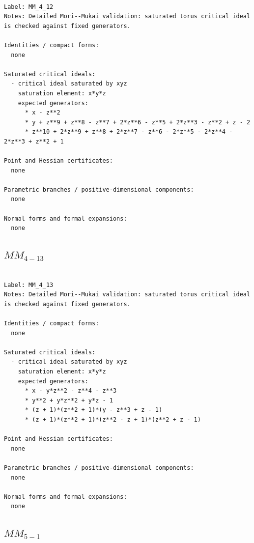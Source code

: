 \documentclass[10pt,a4paper]{article}
\begin{document}
\begin{lstlisting}

Label: MM_4_12
Notes: Detailed Mori--Mukai validation: saturated torus critical ideal is checked against fixed generators.

Identities / compact forms:
  none

Saturated critical ideals:
  - critical ideal saturated by xyz
    saturation element: x*y*z
    expected generators:
      * x - z**2
      * y + z**9 + z**8 - z**7 + 2*z**6 - z**5 + 2*z**3 - z**2 + z - 2
      * z**10 + 2*z**9 + z**8 + 2*z**7 - z**6 - 2*z**5 - 2*z**4 - 2*z**3 + z**2 + 1

Point and Hessian certificates:
  none

Parametric branches / positive-dimensional components:
  none

Normal forms and formal expansions:
  none

\end{lstlisting}

\subsection*{$ MM_{4-13} $}

\begin{lstlisting}

Label: MM_4_13
Notes: Detailed Mori--Mukai validation: saturated torus critical ideal is checked against fixed generators.

Identities / compact forms:
  none

Saturated critical ideals:
  - critical ideal saturated by xyz
    saturation element: x*y*z
    expected generators:
      * x - y*z**2 - z**4 - z**3
      * y**2 + y*z**2 + y*z - 1
      * (z + 1)*(z**2 + 1)*(y - z**3 + z - 1)
      * (z + 1)*(z**2 + 1)*(z**2 - z + 1)*(z**2 + z - 1)

Point and Hessian certificates:
  none

Parametric branches / positive-dimensional components:
  none

Normal forms and formal expansions:
  none

\end{lstlisting}

\subsection*{$ MM_{5-1} $}
\end{document}
